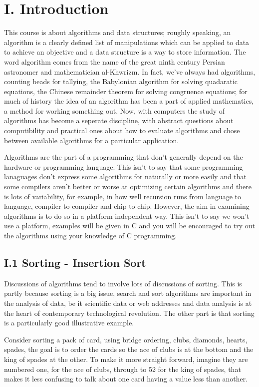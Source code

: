 \documentclass[11pt,a4paper]{scrartcl}
\begin{document}
\section*{I. Introduction}

This course is about algorithms and data structures; roughly speaking,
an algorithm is a clearly defined list of manipulations which can be
applied to data to achieve an objective and a data structure is a way
to store information. The word algorithm comes from the name of the
great ninth century Persian astronomer and mathematician
al-Khwrizm. In fact, we've always had algorithms, counting
beads for tallying, the Babylonian algorithm for solving quadaratic
equations, the Chinese remainder theorem for solving congruence
equations; for much of history the idea of an algorithm has been a
part of applied mathematics, a method for working something out. Now,
with computers the study of algorithms has become a seperate
discipline, with abstract questions about computibility and practical
ones about how to evaluate algorithms and chose between available
algorithms for a particular application.

Algorithms are the part of a programming that don't generally depend
on the hardware or programming language. This isn't to say that some
programming lanaguages don't express some algorithms for naturally or
more easily and that some compilers aren't better or worse at
optimizing certain algorithms and there is lots of variability, for
example, in how well recursion runs from language to language, compiler
to compiler and chip to chip. However, the aim in examining algorithms
is to do so in a platform independent way. This isn't to say we won't
use a platform, examples will be given in C and you will be encouraged
to try out the algorithms using your knowledge of C programming.

\subsection*{I.1 Sorting - Insertion Sort}

Discussions of algorithms tend to involve lots of discussions of
sorting. This is partly because sorting is a big issue, search and
sort algorithms are important in the analysis of data, be it
scientific data or web addresses and data analysis is at the heart of
contemporary technological revolution. The other part is that sorting
is a particularly good illustrative example. 

Consider sorting a pack of card, using bridge ordering, clubs,
diamonds, hearts, spades, the goal is to order the cards so the ace of
clubs is at the bottom and the king of spades at the other. To make it
more straight forward, imagine they are numbered one, for the ace of
clubs, through to 52 for the king of spades, that makes it less
confusing to talk about one card having a value less than another.
\end{document}
